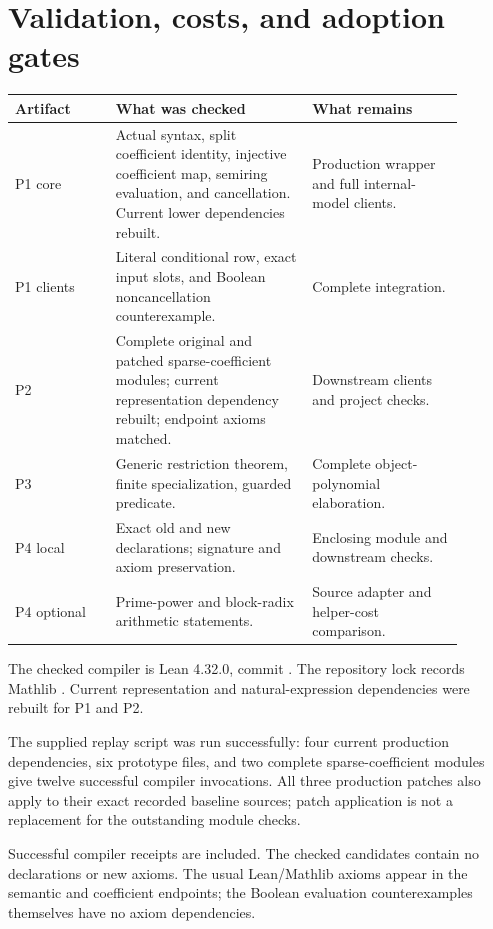 \clearpage
\section{Validation, costs, and adoption gates}

\begin{longtable}{L{0.20\linewidth}L{0.39\linewidth}L{0.30\linewidth}}
\toprule Artifact & What was checked & What remains\\ \midrule
P1 core & Actual syntax, split coefficient identity, injective coefficient
map, semiring evaluation, and cancellation. Current lower dependencies rebuilt. &
Production wrapper and full internal-model clients.\\
P1 clients & Literal conditional row, exact input slots, and Boolean
noncancellation counterexample. &
Complete  integration.\\
P2 & Complete original and patched sparse-coefficient modules;
current representation dependency rebuilt; endpoint axioms matched. &
Downstream clients and project checks.\\
P3 & Generic restriction theorem, finite specialization, guarded predicate. &
Complete object-polynomial elaboration.\\
P4 local & Exact old and new declarations; signature and axiom preservation. &
Enclosing module and downstream checks.\\
P4 optional & Prime-power and block-radix arithmetic statements. &
Source adapter and helper-cost comparison.\\
\bottomrule
\end{longtable}

The checked compiler is Lean 4.32.0,
commit .
The repository lock records Mathlib
.
Current representation and natural-expression dependencies were rebuilt for
P1 and P2.

The supplied replay script was run successfully: four current production
dependencies, six prototype files, and two complete sparse-coefficient
modules give twelve successful compiler invocations. All three production
patches also apply to their exact recorded baseline sources; patch application
is not a replacement for the outstanding module checks.

Successful compiler receipts are included. The checked candidates contain
no  declarations or new axioms. The usual Lean/Mathlib axioms
appear in the semantic and coefficient endpoints; the Boolean evaluation
counterexamples themselves have no axiom dependencies.

